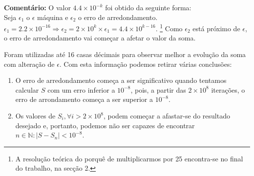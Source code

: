 \documentclass{article}
\begin{document}
\textbf{Comentário:}
O valor $4.4\times10^{-k}$ foi obtido da seguinte forma:\\
Seja $\epsilon_{1}$ o $\epsilon$ máquina e $\epsilon_2$ o erro de arredondamento.
$\epsilon_{1}=2.2\times 10^{-16} \Rightarrow \epsilon_2 = 2\times 10^{k}\times \epsilon_{1} = 4.4\times 10^{k-16}$. \footnote[2]{A resolução teórica do porquê de multiplicarmos por 25 encontra-se no final do trabalho, na secção 2.}
Como $\epsilon_2$ está próximo de $\epsilon$, o erro de arredondamento vai começar a afetar o valor da soma.\par
Foram utilizadas até 16 casas décimais para observar melhor a evolução da soma com alteração de $\epsilon$.
 Com esta informação podemos retirar várias conclusões:
\begin{enumerate}
  \item{O erro de arredondamento começa a ser significativo quando tentamos calcular $S$ com um erro inferior a $10^{-8}$, pois, a partir das $2\times 10^{8}$ iterações, o erro de arrondamento começa a ser superior a $10^{-8}$.}
  \item{Os valores de $S_i, \forall i>2\times 10^{8}$, podem começar a afastar-se do resultado desejado e, portanto, podemos não ser capazes de encontrar $n\in\mathbb{N}:|S-S_n|<10^{-8}$.}
\end{enumerate}
\end{document}
